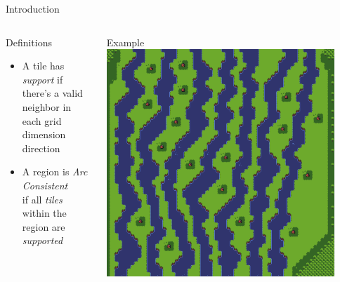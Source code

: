 \documentclass{beamer}
\begin{document}
  \begin{frame}[fragile]{Introduction}
    \begin{columns}[T,onlytextwidth]
        \begin{block}{Definitions}
          \hfill \\
          \begin{itemize}
            \item A tile has \textit{support} if \\
              there's a valid neighbor
              in each
              grid dimension direction
            \item A region is \textit{Arc Consistent} \\ if all \textit{tiles} within the region are \textit{supported}
          \end{itemize}
        \end{block}
        \begin{block}{Example}
          \includegraphics[width=0.9\textwidth]{img/forestmicro_64x64.pdf}
        \end{block}
    \end{columns}
  \end{frame}
\end{document}
